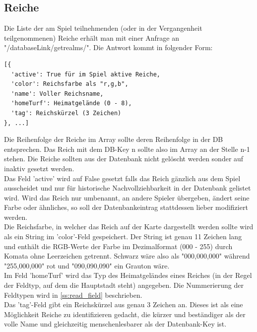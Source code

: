 \documentclass[11pt,a4paper,twocolumn]{article}
\begin{document}
\subsection{Reiche}\label{ss:read_realms}
Die Liste der am Spiel teilnehmenden (oder in der Vergangenheit teilgenommenen) Reiche erhält man mit einer Anfrage an "/databaseLink/getrealms/". Die Antwort kommt in folgender Form:
\begin{lstlisting}
[{
  'active': True für im Spiel aktive Reiche,
  'color': Reichsfarbe als "r,g,b",
  'name': Voller Reichsname,
  'homeTurf': Heimatgelände (0 - 8),
  'tag': Reichskürzel (3 Zeichen)
}, ...]
\end{lstlisting}
Die Reihenfolge der Reiche im Array sollte deren Reihenfolge in der DB entsprechen. Das Reich mit dem DB-Key n sollte also im Array an der Stelle n-1 stehen. Die Reiche sollten aus der Datenbank nicht gelöscht werden sonder auf inaktiv gesetzt werden.\\
Das Feld 'active' wird auf False gesetzt falls das Reich gänzlich aus dem Spiel ausscheidet und nur für historische Nachvollziehbarkeit in der Datenbank gelistet wird. Wird das Reich nur umbenannt, an andere Spieler übergeben, ändert seine Farbe oder ähnliches, so soll der Datenbankeintrag stattdessen lieber modifiziert werden.\\
Die Reichsfarbe, in welcher das Reich auf der Karte dargestellt werden sollte wird als ein String im 'color'-Feld gespeichert. Der String ist genau 11 Zeichen lang und enthält die RGB-Werte der Farbe im Dezimalformat (000 - 255) durch Komata ohne Leerzeichen getrennt. Schwarz wäre also als "000,000,000" während "255,000,000" rot und "090,090,090" ein Grauton wäre.\\
Im Feld 'homeTurf' wird das Typ des Heimatgeländes eines Reiches (in der Regel der Feldtyp, auf dem die Hauptstadt steht) angegeben. Die Nummerierung der Feldtypen wird in \ref{ss:read_field} beschrieben.\\
Das 'tag'-Feld gibt ein Reichskürzel aus genau 3 Zeichen an. Dieses ist als eine Möglichkeit Reiche zu identifizieren gedacht, die kürzer und beständiger als der volle Name und gleichzeitig menschenlesbarer als der Datenbank-Key ist.
\end{document}
